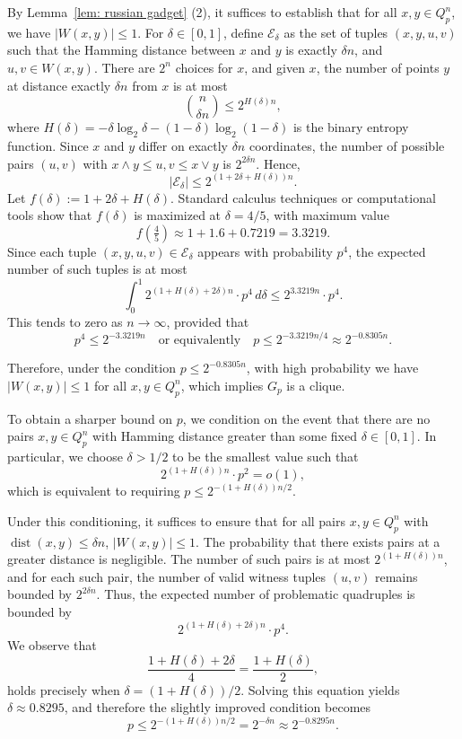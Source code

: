 \documentclass[11pt]{article}
\def\dist{\operatorname {dist}}
\theoremstyle{definition}
\theoremstyle{plain}
\begin{document}
By Lemma~\ref{lem: russian gadget} (2), it suffices to establish that for all \( x, y \in Q_p^n \), we have \( |W(x,y)| \leq 1 \).
For \( \delta \in [0,1] \), define \( \mathcal{E}_{\delta} \) as the set of tuples \( (x, y, u, v) \) such that the Hamming distance between \( x \) and \( y \) is exactly \( \delta n \), and \( u, v \in W(x,y) \).
There are \( 2^n \) choices for \( x \), and given \( x \), the number of points \( y \) at distance exactly \( \delta n \) from \( x \) is at most
\[
\binom{n}{\delta n} \leq 2^{H(\delta)n},
\]
where \( H(\delta) = -\delta \log_2 \delta - (1-\delta) \log_2 (1-\delta) \) is the binary entropy function. Since \( x \) and \( y \) differ on exactly \( \delta n \) coordinates, the number of possible pairs \( (u,v) \) with \( x \land y \leq u,v \leq x \lor y \) is \( 2^{2\delta n} \). Hence,
\[
|\mathcal{E}_{\delta}| \leq 2^{(1 + 2\delta + H(\delta))n}.
\]
Let \( f(\delta) := 1 + 2\delta + H(\delta) \).
Standard calculus techniques or computational tools show that \( f(\delta) \) is maximized at \( \delta = 4/5 \), with maximum value
\[
f\left(\tfrac{4}{5}\right)  \approx 1 + 1.6 + 0.7219 = 3.3219.
\]
Since each tuple \( (x,y,u,v) \in \mathcal{E}_{\delta} \) appears with probability \( p^4 \), the expected number of such tuples is at most
\[
\int_0^1 2^{(1 + H(\delta) + 2\delta)n} \cdot p^4 \, d\delta \leq 2^{3.3219 n} \cdot p^4.
\]
This tends to zero as \( n \to \infty \), provided that
\[
p^4 \leq 2^{-3.3219 n} \quad \text{or equivalently} \quad p \leq 2^{-3.3219n/4} \approx 2^{-0.8305 n}.
\]

Therefore, under the condition \( p \leq 2^{-0.8305 n} \), with high probability we have \( |W(x,y)| \leq 1 \) for all \( x,y \in Q_p^n \), which implies \( G_p \) is a clique.


To obtain a sharper bound on \( p \), we condition on the event that there are no pairs \( x, y \in Q_p^n \) with Hamming distance greater than some fixed \( \delta \in [0,1] \). In particular, we choose \( \delta>1/2 \) to be the smallest value such that
\[
2^{(1 + H(\delta))n} \cdot p^2 = o(1),
\]
which is equivalent to requiring
\(
p \leq 2^{-(1 + H(\delta))n/2}.
\)

Under this conditioning, it suffices to ensure that for all pairs \( x,y \in Q_p^n \) with \( \dist(x,y) \leq \delta n \),  \( |W(x,y)| \leq 1 \). The probability that there exists pairs at a greater distance is negligible. The number of such pairs is at most \( 2^{(1 + H(\delta))n} \), and for each such pair, the number of valid witness tuples \( (u,v) \) remains bounded by \( 2^{2\delta n} \). Thus, the expected number of problematic quadruples is bounded by
\[
2^{(1 + H(\delta) + 2\delta)n} \cdot p^4.
\]
We observe that
\[
\frac{1 + H(\delta) + 2\delta}{4} = \frac{1 + H(\delta)}{2},
\]
 holds precisely when \(\delta = (1 + H(\delta))/2 \). Solving this equation yields \( \delta \approx 0.8295 \), and therefore the slightly improved condition becomes
\[
p \leq 2^{-(1 + H(\delta))n/2} =2^{-\delta n} \approx 2^{-0.8295 n}.
\]
\end{document}
